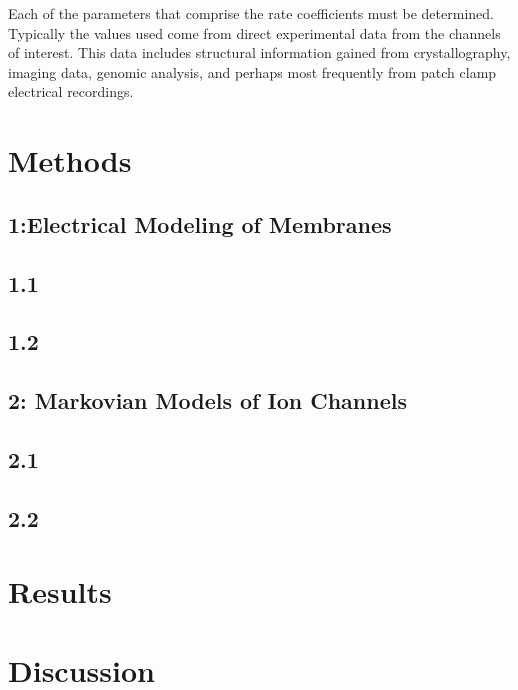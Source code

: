 \documentclass[11pt]{article}
\begin{document}
\par{}
Each of the parameters that comprise the rate coefficients must be determined. Typically the values used come from direct experimental data from the channels of interest. This data includes structural information gained from crystallography, imaging data, genomic analysis, and perhaps most frequently from patch clamp electrical recordings. 

\section{Methods}
\subsection{1:Electrical Modeling of Membranes}

\subsection{1.1}

\subsection{1.2}


\subsection{2: Markovian Models of Ion Channels}
\subsection{2.1}

\subsection{2.2}

\section{Results}


\section{Discussion} 





\end{document}
